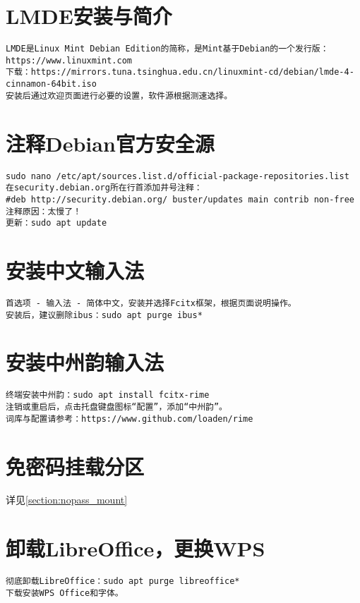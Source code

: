 \documentclass[a4paper,fontset=fandol,zihao=-4,linespread=1.2]{ctexbook}
\begin{document}
\section{LMDE安装与简介}
\begin{lstlisting}
LMDE是Linux Mint Debian Edition的简称，是Mint基于Debian的一个发行版：https://www.linuxmint.com
下载：https://mirrors.tuna.tsinghua.edu.cn/linuxmint-cd/debian/lmde-4-cinnamon-64bit.iso
安装后通过欢迎页面进行必要的设置，软件源根据测速选择。
\end{lstlisting}

\section{注释Debian官方安全源}
\begin{lstlisting}
sudo nano /etc/apt/sources.list.d/official-package-repositories.list
在security.debian.org所在行首添加井号注释：
#deb http://security.debian.org/ buster/updates main contrib non-free
注释原因：太慢了！
更新：sudo apt update
\end{lstlisting}

\section{安装中文输入法}
\begin{lstlisting}
首选项 - 输入法 - 简体中文，安装并选择Fcitx框架，根据页面说明操作。
安装后，建议删除ibus：sudo apt purge ibus*
\end{lstlisting}

\section{安装中州韵输入法} \label{section:fcitx_rime}
\begin{lstlisting}
终端安装中州韵：sudo apt install fcitx-rime
注销或重启后，点击托盘键盘图标“配置”，添加“中州韵”。
词库与配置请参考：https://www.github.com/loaden/rime
\end{lstlisting}

\section{免密码挂载分区}
详见\ref{section:nopass_mount}

\section{卸载LibreOffice，更换WPS}
\begin{lstlisting}
彻底卸载LibreOffice：sudo apt purge libreoffice*
下载安装WPS Office和字体。
\end{lstlisting}
\end{document}
